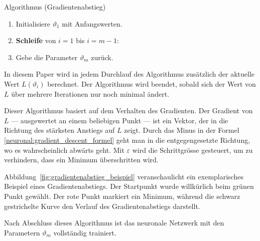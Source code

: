 \begin{aufgabe}
    Algorithmus (Gradientenabstieg)
%
    \begin{enumerate}
        \item Initialisiere \( \vartheta_1 \) mit Anfangswerten.
        \item \textbf{Schleife} von \( i = 1 \) bis \( i = m - 1 \):
        \item Gebe die Parameter \( \vartheta_m \) zurück.
    \end{enumerate}
    \label{neuronal:gradient_descent}
\end{aufgabe}

In diesem Paper wird in jedem Durchlauf des Algorithmus zusätzlich der aktuelle Wert \( L(\vartheta_i) \) berechnet.
Der Algorithmus wird beendet, sobald sich der Wert von \( L \) über mehrere Iterationen nur noch minimal ändert.

Dieser Algorithmus basiert auf dem Verhalten des Gradienten.
Der Gradient von $L$ --- ausgewertet an einem beliebigen Punkt --- ist ein Vektor, der in die Richtung des stärksten Anstiegs auf $L$ zeigt.
Durch das Minus in der Formel \eqref{neuronal:gradient_descent_formel} geht man in die entgegengesetzte Richtung, wo es wahrscheinlich abwärts geht.
Mit $\varepsilon$ wird die Schrittgrösse gesteuert, um zu verhindern, dass ein Minimum überschritten wird.

Abbildung~\ref{fig:gradientenabstieg_beispiel} veranschaulicht ein exemplarisches Beispiel eines Gradientenabstiegs.
Der Startpunkt wurde willkürlich beim grünen Punkt gewählt.
Der rote Punkt markiert ein Minimum, während die schwarz gestrichelte Kurve den Verlauf des Gradientenabstiegs darstellt.

Nach Abschluss dieses Algorithmus ist das neuronale Netzwerk mit den Parametern \( \vartheta_m \) vollständig trainiert.

